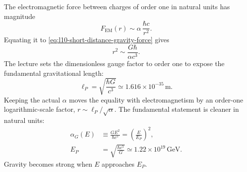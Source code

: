 The electromagnetic force between charges of order one in natural units
has magnitude
\begin{equation}
  F_{\mathrm{EM}}(r)
  \sim
  \alpha\,\frac{\hbar c}{r^2}.
  \label{eq:l10-em-force-alpha}
\end{equation}
Equating it to \eqref{eq:l10-short-distance-gravity-force} gives
\begin{equation}
  r^2\sim\frac{G\hbar}{\alpha c^3}.
  \label{eq:l10-gravity-em-crossing}
\end{equation}
The lecture sets the dimensionless gauge factor to order one to expose the
fundamental gravitational length:
\begin{equation}
  \boxed{\ell_P=\sqrt{\frac{\hbar G}{c^3}}}
  \simeq1.616\times10^{-35}\,\mathrm{m}.
  \label{eq:l10-planck-length}
\end{equation}
Keeping the actual \(\alpha\) moves the equality with electromagnetism by
an order-one logarithmic-scale factor, \(r\sim\ell_P/\sqrt\alpha\). The
fundamental statement is cleaner in natural units:
\begin{equation}
\begin{aligned}
  \alpha_G(E)
  &\equiv\frac{GE^2}{\hbar c^5}
  =\left(\frac{E}{E_P}\right)^2,
  \\
  E_P
  &=\sqrt{\frac{\hbar c^5}{G}}
  \simeq1.22\times10^{19}\,\mathrm{GeV}.
\end{aligned}
  \label{eq:l10-gravitational-coupling}
\end{equation}
Gravity becomes strong when \(E\) approaches \(E_P\).

\begin{classroomqa}
\end{classroomqa}

\begin{classroomqa}
\end{classroomqa}

